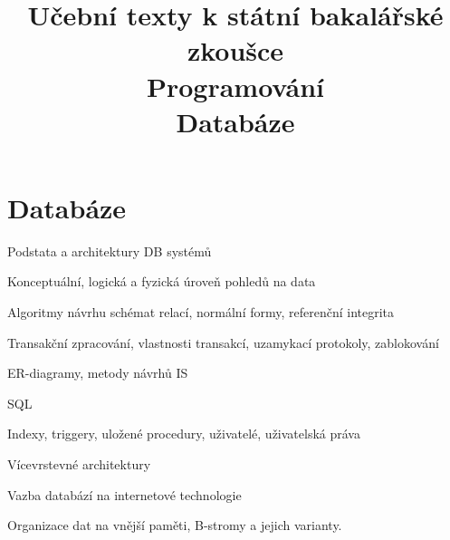 \clearpage  \clearpage
\title{\LARGE Učební texty k státní bakalářské zkoušce \\ Programování \\ Databáze}

\maketitle
\newpage
\setcounter{section}{2}
\section{Databáze}
\begin{pozadavky}
\begin{pitemize}
\item Podstata a architektury DB systémů
\item Konceptuální, logická a fyzická úroveň pohledů na data
\item Algoritmy návrhu schémat relací, normální formy, referenční integrita
\item Transakční zpracování, vlastnosti transakcí, uzamykací protokoly, zablokování
\item ER-diagramy, metody návrhů IS
\item SQL
\item Indexy, triggery, uložené procedury, uživatelé, uživatelská práva
\item Vícevrstevné architektury
\item Vazba databází na internetové technologie
\item Organizace dat na vnější paměti, B-stromy a jejich varianty.
\end{pitemize}
\end{pozadavky}












